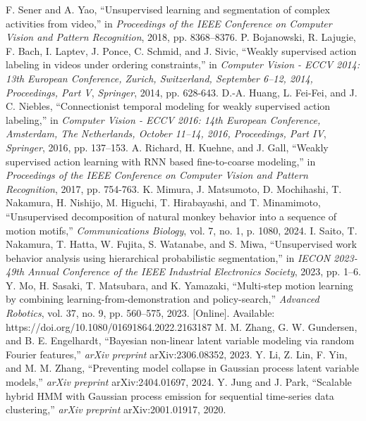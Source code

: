 \documentclass[conference]{IEEEtran}
\begin{document}
\begin{thebibliography}{00}
 F. Sener and A. Yao, “Unsupervised learning and segmentation of complex activities from video,” in \textit{Proceedings of the IEEE Conference on Computer Vision and Pattern Recognition}, 2018, pp. 8368--8376.
 P. Bojanowski, R. Lajugie, F. Bach, I. Laptev, J. Ponce, C. Schmid, and J. Sivic, “Weakly supervised action labeling in videos under ordering constraints,” in \textit{Computer Vision - ECCV 2014: 13th European Conference, Zurich, Switzerland, September 6--12, 2014, Proceedings, Part V}, \textit{Springer}, 2014, pp. 628-643.
 D.-A. Huang, L. Fei-Fei, and J. C. Niebles, “Connectionist temporal modeling for weakly supervised action labeling,” in \textit{Computer Vision - ECCV 2016: 14th European Conference, Amsterdam, The Netherlands, October 11--14, 2016, Proceedings, Part IV}, \textit{Springer}, 2016, pp. 137--153.
 A. Richard, H. Kuehne, and J. Gall, “Weakly supervised action learning with RNN based fine-to-coarse modeling,” in \textit{Proceedings of the IEEE Conference on Computer Vision and Pattern Recognition}, 2017, pp. 754-763.
 K. Mimura, J. Matsumoto, D. Mochihashi, T. Nakamura, H. Nishijo, M. Higuchi, T. Hirabayashi, and T. Minamimoto, “Unsupervised decomposition of natural monkey behavior into a sequence of motion motifs,” \textit{Communications Biology}, vol. 7, no. 1, p. 1080, 2024.
 I. Saito, T. Nakamura, T. Hatta, W. Fujita, S. Watanabe, and S. Miwa, “Unsupervised work behavior analysis using hierarchical probabilistic segmentation,” in \textit{IECON 2023-49th Annual Conference of the IEEE Industrial Electronics Society}, 2023, pp. 1--6.
 Y. Mo, H. Sasaki, T. Matsubara, and K. Yamazaki, “Multi-step motion learning by combining learning-from-demonstration and policy-search,” \textit{Advanced Robotics}, vol. 37, no. 9, pp. 560--575, 2023. [Online]. Available: https://doi.org/10.1080/01691864.2022.2163187
 M. M. Zhang, G. W. Gundersen, and B. E. Engelhardt, “Bayesian non-linear latent variable modeling via random Fourier features,” \textit{arXiv preprint} arXiv:2306.08352, 2023.
 Y. Li, Z. Lin, F. Yin, and M. M. Zhang, “Preventing model collapse in Gaussian process latent variable models,” \textit{arXiv preprint} arXiv:2404.01697, 2024.
 Y. Jung and J. Park, “Scalable hybrid HMM with Gaussian process emission for sequential time-series data clustering,” \textit{arXiv preprint} arXiv:2001.01917, 2020.
\end{thebibliography}

\vspace{12pt}
\end{document}
